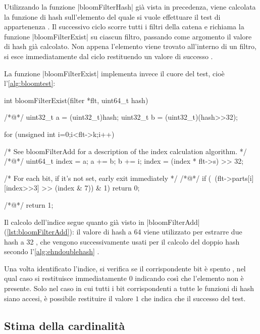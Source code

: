 Utilizzando la funzione \cverb|bloomFilterHash| già vista in precedenza, viene calcolata la funzione
di hash sull'elemento del quale si vuole effettuare il test di appartenenza . Il successivo
ciclo  scorre tutti i filtri della catena e richiama la funzione \cverb|bloomFilterExist|
su ciascun filtro, passando come argomento il valore di hash già calcolato. Non appena l'elemento
viene trovato all'interno di un filtro, si esce immediatamente dal ciclo restituendo un valore di
successo .

La funzione \cverb|bloomFilterExist| implementa invece il cuore del test, cioè 
l'\autoref{alg:bloomtest}:

\begin{commentedsource}[style=csource,caption=Test di appartenenza di un elemento ad un filtro]
int bloomFilterExist(filter *flt, uint64_t hash) {
/*@\lnote@*/    uint32_t a = (uint32_t)hash;
    uint32_t b = (uint32_t)(hash>>32);

    for (unsigned int i=0;i<flt->k;i++) {
        /* See bloomFilterAdd for a description of the index calculation algorithm. */
/*@\lnote@*/        uint64_t index = a;
        a += b; b += i;
        index = (index * flt->s) >> 32;

        /* For each bit, if it's not set, early exit immediately */
/*@\lnote@*/        if (~(flt->parts[i][index>>3] >> (index & 7)) & 1)
            return 0;
    }
/*@\lnote@*/    return 1;
}
\end{commentedsource}

Il calcolo dell'indice segue quanto già visto in \cverb|bloomFilterAdd|
(\autoref{lst:bloomFilterAdd}): il valore di hash a \SI{64}{\bit} viene utilizzato per estrarre due
hash a \SI{32}{\bit} , che vengono successivamente usati per il calcolo del doppio hash
secondo l'\autoref{alg:ehndoublehash} .

Una volta identificato l'indice, si verifica se il corrispondente bit è spento , nel qual
caso si restituisce immediatamente $0$ indicando così che l'elemento non è presente. Solo nel caso
in cui tutti i bit corrispondenti a tutte le funzioni di hash siano accesi, è possibile restituire il
valore $1$  che indica che il successo del test.

\subsection{Stima della cardinalità}
\label{sec:patch:card}

